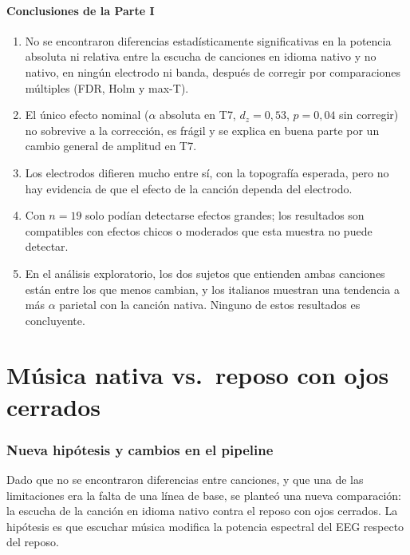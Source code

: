 \documentclass[11pt,a4paper]{article}
\begin{document}
\subsection{Conclusiones de la Parte I}
\begin{enumerate}
  \item No se encontraron diferencias estadísticamente significativas en la potencia absoluta ni relativa entre la escucha de canciones en idioma nativo y no nativo, en ningún electrodo ni banda, después de corregir por comparaciones múltiples (FDR, Holm y max-T).
  \item El único efecto nominal ($\alpha$ absoluta en T7, $d_z = 0{,}53$, $p = 0{,}04$ sin corregir) no sobrevive a la corrección, es frágil y se explica en buena parte por un cambio general de amplitud en T7.
  \item Los electrodos difieren mucho entre sí, con la topografía esperada, pero no hay evidencia de que el efecto de la canción dependa del electrodo.
  \item Con $n = 19$ solo podían detectarse efectos grandes; los resultados son compatibles con efectos chicos o moderados que esta muestra no puede detectar.
  \item En el análisis exploratorio, los dos sujetos que entienden ambas canciones están entre los que menos cambian, y los italianos muestran una tendencia a más $\alpha$ parietal con la canción nativa. Ninguno de estos resultados es concluyente.
\end{enumerate}

\part{Música nativa vs.\ reposo con ojos cerrados}

\section{Nueva hipótesis y cambios en el pipeline}
Dado que no se encontraron diferencias entre canciones, y que una de las limitaciones era la falta de una línea de base, se planteó una nueva comparación: la escucha de la canción en idioma nativo contra el reposo con ojos cerrados. La hipótesis es que escuchar música modifica la potencia espectral del EEG respecto del reposo.
\end{document}
